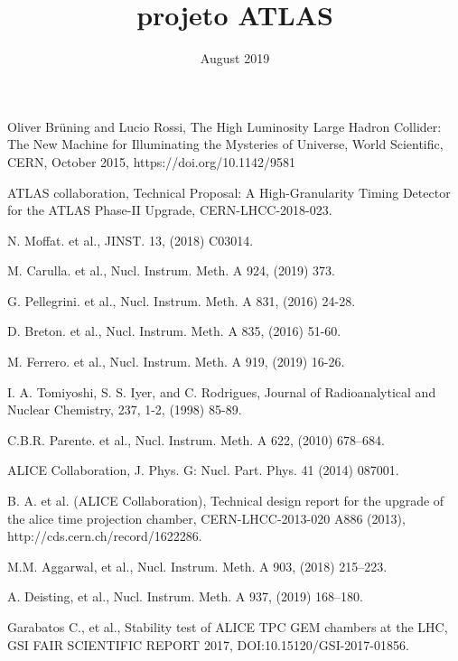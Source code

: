 \documentclass{report}
\title{projeto ATLAS}
\date{August 2019}
\begin{document}





\tableofcontents






%
\newpage
\begin{thebibliography}{9}

 Oliver Brüning and Lucio Rossi, The High Luminosity Large Hadron Collider: The New Machine for Illuminating the Mysteries of Universe, World Scientific, CERN, October 2015,  https://doi.org/10.1142/9581

 ATLAS collaboration, Technical Proposal: A High-Granularity Timing Detector for the ATLAS Phase-II Upgrade, CERN-LHCC-2018-023.

 N. Moffat. et al., JINST. 13, (2018) C03014.

 M. Carulla. et al., Nucl. Instrum. Meth. A 924, (2019) 373. 

%
 G. Pellegrini. et al., Nucl. Instrum. Meth. A 831, (2016) 24-28.

 D. Breton. et al., Nucl. Instrum. Meth. A 835, (2016) 51-60.

 M. Ferrero. et al., Nucl. Instrum. Meth. A 919, (2019) 16-26.
%

 I. A. Tomiyoshi, S. S. Iyer, and C. Rodrigues, Journal of Radioanalytical and Nuclear Chemistry, 237, 1-2, (1998) 85-89.

 C.B.R. Parente. et al., Nucl. Instrum. Meth. A 622, (2010) 678–684.

 ALICE Collaboration, J. Phys. G: Nucl. Part. Phys. 41 (2014) 087001.

 B. A. et al. (ALICE Collaboration), Technical design report for the upgrade of the alice time projection chamber, CERN-LHCC-2013-020
A886 (2013), http://cds.cern.ch/record/1622286.


 M.M. Aggarwal, et al., Nucl. Instrum. Meth. A 903, (2018) 215–223. 

 A. Deisting, et al., Nucl. Instrum. Meth. A 937, (2019) 168–180.

%
 Garabatos C., et al., Stability test of ALICE TPC GEM chambers at the LHC, GSI FAIR SCIENTIFIC REPORT 2017, DOI:10.15120/GSI-2017-01856.
%


\end{thebibliography}
\end{document}
